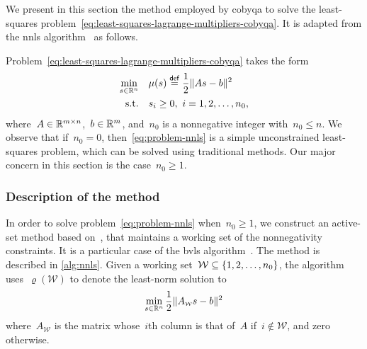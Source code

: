 We present in this section the method employed by \gls{cobyqa} to solve the least-squares problem~\cref{eq:least-squares-lagrange-multipliers-cobyqa}.
It is adapted from the \gls{nnls} algorithm~\cite[Alg.~23.10]{Lawson_Hanson_1987} as follows.

Problem~\cref{eq:least-squares-lagrange-multipliers-cobyqa} takes the form
\begin{subequations}
    \label{eq:problem-nnls}
    \begin{align}
        \min_{\sstep \in \R^n}  & \quad \mu(\sstep) \eqdef \frac{1}{2} \norm{A \sstep - b}^2\\
        \text{s.t.}             & \quad \sstep_i \ge 0, ~ i = 1, 2, \dots, n_0,
    \end{align}
\end{subequations}
where~$A \in \mathbb{R}^{m \times n}$,~$b \in \mathbb{R}^m$, and~$n_0$ is a nonnegative integer with~$n_0 \le n$.
We observe that if~$n_0 = 0$, then~\cref{eq:problem-nnls} is a simple unconstrained least-squares problem, which can be solved using traditional methods.
Our major concern in this section is the case~$n_0 \ge 1$.

\subsubsection{Description of the method}

In order to solve problem~\cref{eq:problem-nnls} when~$n_0 \ge 1$, we construct an active-set method based on~\cite[Alg.~23.10]{Lawson_Hanson_1987}, that maintains a working set of the nonnegativity constraints.
It is a particular case of the \gls{bvls} algorithm~\cite{Stark_Parker_1995}.
The method is described in \cref{alg:nnls}.
Given a working set~$\mathcal{W} \subseteq \{1, 2, \dots, n_0\}$, the algorithm uses~$\varrho(\mathcal{W})$ to denote the least-norm solution to
\begin{equation*}
    \min_{\sstep \in \R^n} \frac{1}{2} \norm{A_{\scriptscriptstyle \mathcal{W}} \sstep - b}^2
\end{equation*}
where~$A_{\scriptscriptstyle \mathcal{W}}$ is the matrix whose~$i$th column is that of~$A$ if~$i \notin \mathcal{W}$, and zero otherwise.

